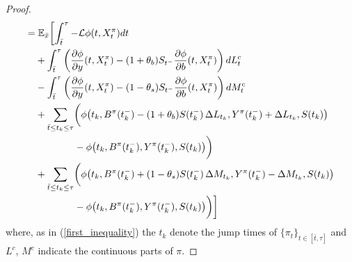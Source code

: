 \begin{proof}
\begin{align}
    = & \; \mathbb{E}_{\bar x} \biggl[ \int_{\bar t}^{\tau} -\mathcal{L} \phi(t,X^{\pi}_t) dt \\ \nonumber
    & + \int_{\bar t}^{\tau} \left(\frac{\partial \phi}{\partial y}(t, X^{\pi}_t) -(1+\theta_b) S_{t^-} \frac{\partial \phi}{\partial b}( t, X^{\pi}_t)\right) dL^c_t \\ \nonumber
    & - \int_{\bar t}^{\tau} \left(\frac{\partial \phi}{\partial y}( t, X^{\pi}_t)-(1-\theta_s) S_{t^-} \frac{\partial \phi}{\partial b}( t, X^{\pi}_t)\right) dM^c_t \\ \nonumber
    & + \sum_{\bar t \leq t_k \leq \tau} \biggl( \phi \bigl( t_k, B^{\pi}(t_k^-) - (1+\theta_b) S(t_k^-)\, \Delta L_{t_k}, Y^{\pi}(t_k^-) + \Delta L_{t_k}, S(t_k) \bigr) \\ \nonumber 
    & \hspace{4em} - \phi \bigl(t_k, B^{\pi}(t_k^-), Y^{\pi}(t_k^-), S(t_k) \bigr) \biggr) \\ \nonumber
    & + \sum_{\bar t \leq t_k \leq \tau} \biggl( \phi \bigl( t_k, B^{\pi}(t_k^-) + (1-\theta_s) S(t_k^-)\, \Delta M_{t_k}, Y^{\pi}(t_k^-) - \Delta M_{t_k}, S(t_k) \bigr) \\
    & \hspace{4em} - \phi \bigl(t_k, B^{\pi}(t_k^-), Y^{\pi}(t_k^-), S(t_k) \bigr) \biggr) \biggr] 
\end{align}
where, as in (\ref{first_inequality}) the $t_k$ denote the jump times of $\{\pi_t\}_{t \in [\bar t, \tau]}$ and $L^c$, $M^c$ indicate the continuous parts of $\pi$. 


\end{proof}

